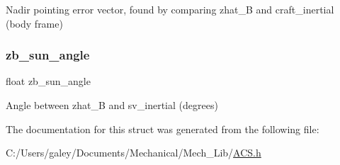 Nadir pointing error vector, found by comparing zhat\+\_\+B and craft\+\_\+inertial (body frame) \mbox{\label{struct_a_c_s_type_acb3d9d99bee55edb832182dae3b2d7fd}} 
\subsubsection{\texorpdfstring{zb\_sun\_angle}{zb\_sun\_angle}}
{\footnotesize\ttfamily float zb\+\_\+sun\+\_\+angle}

Angle between zhat\+\_\+B and sv\+\_\+inertial (degrees) 

The documentation for this struct was generated from the following file\+:\begin{DoxyCompactItemize}
\item 
C\+:/\+Users/galey/\+Documents/\+Mechanical/\+Mech\+\_\+\+Lib/\mbox{\hyperlink{_a_c_s_8h}{A\+C\+S.\+h}}\end{DoxyCompactItemize}
